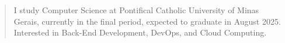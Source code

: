 \begin{quote}
    I study Computer Science at Pontifical Catholic University of Minas Gerais, currently in the final period, expected to graduate in August 2025. Interested in Back-End Development, DevOps, and Cloud Computing.
\end{quote}